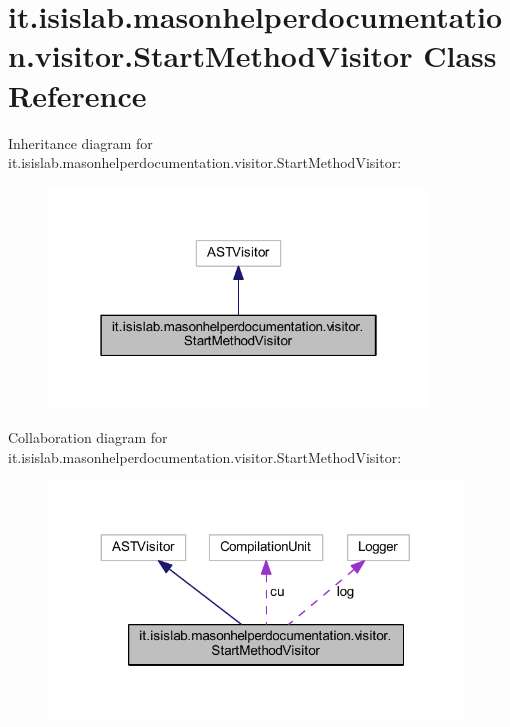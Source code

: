 \hypertarget{classit_1_1isislab_1_1masonhelperdocumentation_1_1visitor_1_1_start_method_visitor}{\section{it.\-isislab.\-masonhelperdocumentation.\-visitor.\-Start\-Method\-Visitor Class Reference}
\label{classit_1_1isislab_1_1masonhelperdocumentation_1_1visitor_1_1_start_method_visitor}
}


Inheritance diagram for it.\-isislab.\-masonhelperdocumentation.\-visitor.\-Start\-Method\-Visitor\-:
\nopagebreak
\begin{figure}[H]
\begin{center}
\leavevmode
\includegraphics[width=286pt]{classit_1_1isislab_1_1masonhelperdocumentation_1_1visitor_1_1_start_method_visitor__inherit__graph}
\end{center}
\end{figure}


Collaboration diagram for it.\-isislab.\-masonhelperdocumentation.\-visitor.\-Start\-Method\-Visitor\-:
\nopagebreak
\begin{figure}[H]
\begin{center}
\leavevmode
\includegraphics[width=311pt]{classit_1_1isislab_1_1masonhelperdocumentation_1_1visitor_1_1_start_method_visitor__coll__graph}
\end{center}
\end{figure}
